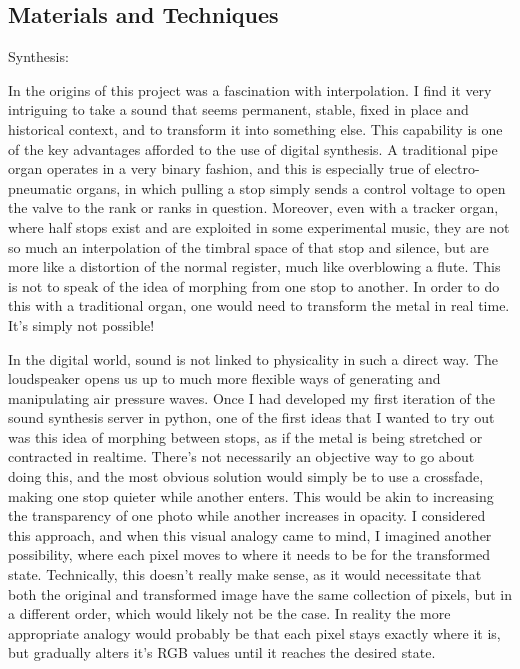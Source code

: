 \documentclass[12pt,twoside,maitrise]{dms_ks}
\theoremstyle{definition}
\begin{document}
{\subsection{Materials and Techniques}

Synthesis:

In the origins of this project was a fascination with interpolation.
I find it very intriguing to take a sound that seems permanent, stable, fixed in place and historical context, and to transform it into something else.
This capability is one of the key advantages afforded to the use of digital synthesis.
A traditional pipe organ operates in a very binary fashion, and this is especially true of electro-pneumatic organs, in which pulling a stop simply sends a control voltage to open the valve to the rank or ranks in question.
Moreover, even with a tracker organ, where half stops exist and are exploited in some experimental music, they are not so much an interpolation of the timbral space of that stop and silence, but are more like a distortion of the normal register, much like overblowing a flute.
This is not to speak of the idea of morphing from one stop to another.
In order to do this with a traditional organ, one would need to transform the metal in real time.
It's simply not possible!

In the digital world, sound is not linked to physicality in such a direct way.
The loudspeaker opens us up to much more flexible ways of generating and manipulating air pressure waves.
Once I had developed my first iteration of the sound synthesis server in python, one of the first ideas that I wanted to try out was this idea of morphing between stops, as if the metal is being stretched or contracted in realtime.
There's not necessarily an objective way to go about doing this, and the most obvious solution would simply be to use a crossfade, making one stop quieter while another enters.
This would be akin to increasing the transparency of one photo while another increases in opacity.
I considered this approach, and when this visual analogy came to mind, I imagined another possibility, where each pixel moves to where it needs to be for the transformed state.
Technically, this doesn't really make sense, as it would necessitate that both the original and transformed image have the same collection of pixels, but in a different order, which would likely not be the case.
In reality the more appropriate analogy would probably be that each pixel stays exactly where it is, but gradually alters it's RGB values until it reaches the desired state.

}
\end{document}
